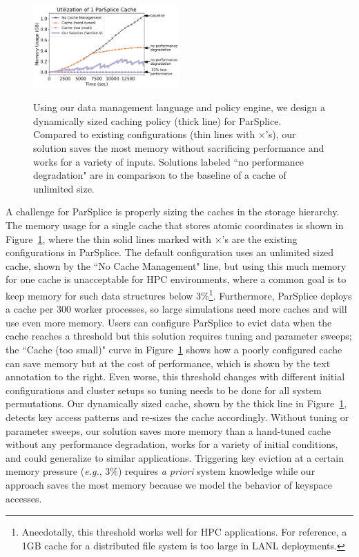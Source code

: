 \begin{figure}[t]
\noindent\includegraphics[width=0.5\textwidth]{figures/cache-management.png}\\
\caption{Using our data management language and policy engine, we design a
dynamically sized caching policy (thick line) for ParSplice.  Compared to
existing configurations (thin lines with \(\times\)'s), our solution saves the most
memory without sacrificing performance and works for a variety of inputs.
Solutions labeled ``no performance degradation" are in comparison to the
baseline of a cache of unlimited size.
\label{fig:cache-management}}
\end{figure}

A challenge for ParSplice is properly sizing the caches in the
storage hierarchy.  The memory usage for a single cache that stores atomic
coordinates is shown in Figure~\ref{fig:cache-management}, where the thin solid
lines marked with \(\times\)'s are the existing configurations in ParSplice.
The default configuration uses an unlimited sized cache, shown by the ``No
Cache Management" line, but using this much memory for one cache is
unacceptable for HPC environments, where a common goal is to keep memory for
such data structures below 3\%\footnote{Anecdotally, this threshold works well
for HPC applications.  For reference, a 1GB cache for a distributed file system
is too large in LANL deployments.}. Furthermore, ParSplice deploys a cache per
300 worker processes, so large simulations need more caches and will use even
more memory.  Users can configure ParSplice to evict data when the cache
reaches a threshold but this solution requires tuning and parameter sweeps; the
``Cache (too small)" curve in Figure~\ref{fig:cache-management} shows how a
poorly configured cache can save memory but at the cost of performance, which
is shown by the text annotation to the right.  Even worse, this threshold
changes with different initial configurations and cluster setups so tuning
needs to be done for all system permutations.  Our dynamically sized cache,
shown by the thick line in Figure~\ref{fig:cache-management}, detects key
access patterns and re-sizes the cache accordingly.  Without tuning or
parameter sweeps, our solution saves more memory than a hand-tuned cache
without any performance degradation, works for a variety of initial conditions,
and could generalize to similar applications. Triggering key eviction at a
certain memory pressure ({\it e.g.}, 3\%) requires {\it a priori} system
knowledge while our approach saves the most memory because we model the
behavior of keyspace accesses.

